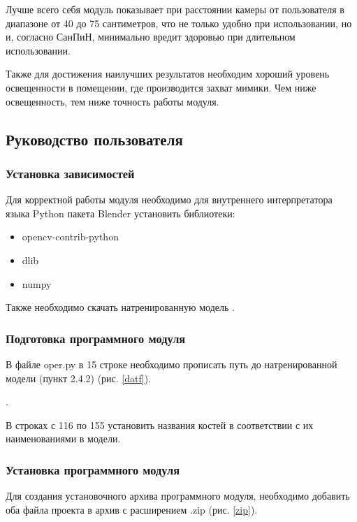Лучше всего себя модуль показывает при расстоянии камеры от пользователя в диапазоне от 40 до 75 сантиметров, что не только удобно при использовании, но и, согласно СанПиН, минимально вредит здоровью при длительном использовании.

Также для достижения наилучших результатов необходим хороший уровень освещенности в помещении, где производится захват мимики. Чем ниже освещенность, тем ниже точность работы модуля. 

\subsection{Руководство пользователя}
\subsubsection {Установка зависимостей}

Для корректной работы модуля необходимо для внутреннего интерпретатора языка Python пакета Blender установить библиотеки:

\begin{itemize}
	\item opencv-contrib-python \cite{ocvcontr}
	\item dlib \cite{dlibpypi}
	\item numpy \cite{numpypypi}
\end{itemize}

Также необходимо скачать натренированную модель \cite{gitdat}.

\subsubsection {Подготовка программного модуля}

В файле oper.py в 15 строке необходимо прописать путь до натренированной модели (пункт 2.4.2) (рис. \ref{datf}).

.

В строках с 116 по 155 установить названия костей в соответствии с их наименованиями в модели.


\subsubsection {Установка программного модуля}

Для создания установочного архива программного модуля, необходимо добавить оба файла проекта в архив с расширением .zip (рис. \ref{zip}).

